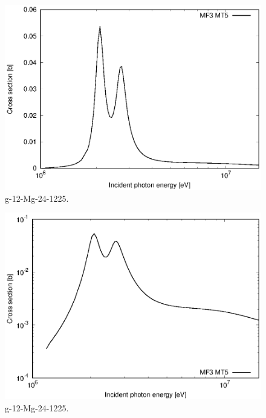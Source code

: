 \begin{figure}
 \includegraphics[width=\linewidth]{eps/g_12-Mg-24_1225.eps}
  \caption{g-12-Mg-24-1225.}
\end{figure}
\begin{figure}
 \includegraphics[width=\linewidth]{eps-log/g_12-Mg-24_1225.eps}
 \caption{g-12-Mg-24-1225.}
\end{figure}
\newpage \clearpage

